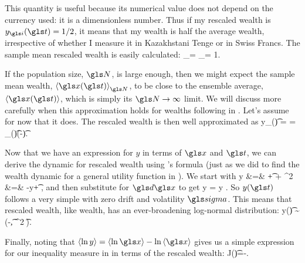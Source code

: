 
This quantity is useful because its numerical value does not 
depend on the currency used: it is a dimensionless number. 
Thus if my rescaled wealth is $y_\gi(\t) = 1/2$, it means that my wealth is half the 
average wealth, irrespective of whether I measure it in Kazakhstani Tenge 
or in Swiss Francs. The sample mean rescaled wealth is easily calculated:
\be
{}_\N = \ave{\frac{\x(\t)}{\ave{\x(\t)}_\N}}_\N = 1.
\ee

If the population size, $\N$, is large enough, then we might expect the sample mean wealth, $\ave{\x(\t)}_\N$, to be close to the ensemble average, $\ave{\x(\t)}$, which is simply its $\N\to\infty$ limit. We will discuss more carefully when this approximation holds for wealths following \GBM in . Let's assume for now that it does. The rescaled wealth is then well approximated as
\be
y_\gi(\t) = \frac{\x_\gi(\t)}{\ave{\x(\t)}} = \x_\gi(\t)\exp(-\gmu \t).
\ee

Now that we have an expression for $y$ in terms of $\x$ and $\t$, we can derive the dynamic for rescaled wealth using \Ito's formula (just as we did to find the wealth dynamic for a general utility function in ). We start with
\bea
\gd y &=& \gd\t + \gd\x +   \gd\x^2 \\
&=& -\gmu y\gd\t + \gd\x {},
\eea
and then substitute  for $\gd\x$ to get
\be
\gd y = y \gsigma \gd\gW.
\ee
So $y(\t)$ follows a very simple \GBM with zero drift and volatility $\gsigma$. This means that rescaled wealth, like wealth, has an ever-broadening log-normal distribution:
\be
\ln y(\t) \sim \mathcal{\N}\left(-\t, \gsigma^2 \t\right).
\ee

Finally, noting that $\ave{\ln y}=\ave{\ln \x}-\ln\ave{\x}$ gives us a simple expression for our inequality measure in  in terms of the rescaled wealth:
\be
J(\t)=-.
\ee


